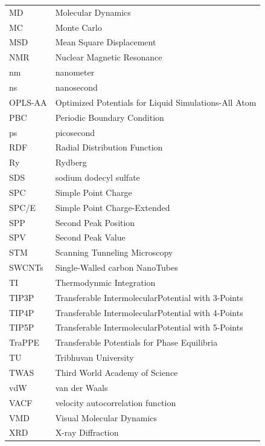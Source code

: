 \newpage
\begin{tabular}{l p{10cm}}
MD      & Molecular Dynamics \\
MC      & Monte Carlo \\
MSD     & Mean Square Displacement\\
NMR     & Nuclear Magnetic Resonance \\
nm      & nanometer\\
ns      & nanosecond\\
OPLS-AA & Optimized Potentials for Liquid Simulations-All Atom \\
PBC     & Periodic Boundary Condition \\
ps      & picosecond\\
RDF     & Radial Distribution Function\\
Ry      & Rydberg \\
SDS     & sodium dodecyl sulfate \\
SPC     & Simple Point Charge\\
SPC/E   & Simple Point Charge-Extended\\
SPP     & Second Peak Position \\
SPV     & Second Peak Value \\
STM     & Scanning Tunneling Microscopy \\
SWCNTs  & Single-Walled carbon NanoTubes \\
TI      & Thermodynmic Integration\\
TIP3P   & Transferable IntermolecularPotential with 3-Points \\
TIP4P   & Transferable IntermolecularPotential with 4-Points\\
TIP5P   & Transferable IntermolecularPotential with 5-Points\\
TraPPE  & Transferable Potentials for Phase Equilibria  \\
TU      & Tribhuvan University \\
TWAS    & Third World Academy of Science \\
vdW     & van der Waals \\
VACF    & velocity autocorrelation function\\
VMD     &  Visual Molecular Dynamics\\
XRD     & X-ray Diffraction
\end{tabular}